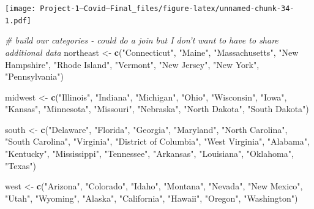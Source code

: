 \documentclass[
]{article}
\newenvironment{Shaded}{\begin{snugshade}}{\end{snugshade}}
\newcommand{\CommentTok}[1]{\textcolor[rgb]{0.56,0.35,0.01}{\textit{#1}}}
\newcommand{\KeywordTok}[1]{\textcolor[rgb]{0.13,0.29,0.53}{\textbf{#1}}}
\newcommand{\NormalTok}[1]{#1}
\newcommand{\StringTok}[1]{\textcolor[rgb]{0.31,0.60,0.02}{#1}}
\begin{document}
\texttt{[image: Project-1---Covid---Final\_files/figure-latex/unnamed-chunk-34-1.pdf]}

\begin{Shaded}
\begin{Highlighting}[]
\CommentTok{# build our categories - could do a join but I don't want to have to share additional data}
\NormalTok{northeast <-}\StringTok{ }\KeywordTok{c}\NormalTok{(}\StringTok{"Connecticut"}\NormalTok{, }\StringTok{"Maine"}\NormalTok{, }\StringTok{"Massachusetts"}\NormalTok{, }\StringTok{"New Hampshire"}\NormalTok{, }\StringTok{"Rhode Island"}\NormalTok{, }\StringTok{"Vermont"}\NormalTok{, }\StringTok{"New Jersey"}\NormalTok{, }\StringTok{"New York"}\NormalTok{, }\StringTok{"Pennsylvania"}\NormalTok{)}

\NormalTok{midwest <-}\StringTok{ }\KeywordTok{c}\NormalTok{(}\StringTok{"Illinois"}\NormalTok{, }\StringTok{"Indiana"}\NormalTok{, }\StringTok{"Michigan"}\NormalTok{, }\StringTok{"Ohio"}\NormalTok{, }\StringTok{"Wisconsin"}\NormalTok{, }\StringTok{"Iowa"}\NormalTok{, }\StringTok{"Kansas"}\NormalTok{, }\StringTok{"Minnesota"}\NormalTok{, }\StringTok{"Missouri"}\NormalTok{, }\StringTok{"Nebraska"}\NormalTok{, }\StringTok{"North Dakota"}\NormalTok{, }\StringTok{"South Dakota"}\NormalTok{)}

\NormalTok{south <-}\StringTok{ }\KeywordTok{c}\NormalTok{(}\StringTok{"Delaware"}\NormalTok{, }\StringTok{"Florida"}\NormalTok{, }\StringTok{"Georgia"}\NormalTok{, }\StringTok{"Maryland"}\NormalTok{, }\StringTok{"North Carolina"}\NormalTok{, }\StringTok{"South Carolina"}\NormalTok{, }\StringTok{"Virginia"}\NormalTok{, }\StringTok{"District of Columbia"}\NormalTok{, }\StringTok{"West Virginia"}\NormalTok{, }\StringTok{"Alabama"}\NormalTok{, }\StringTok{"Kentucky"}\NormalTok{, }\StringTok{"Mississippi"}\NormalTok{, }\StringTok{"Tennessee"}\NormalTok{, }\StringTok{"Arkansas"}\NormalTok{, }\StringTok{"Louisiana"}\NormalTok{, }\StringTok{"Oklahoma"}\NormalTok{, }\StringTok{"Texas"}\NormalTok{)}

\NormalTok{west <-}\StringTok{ }\KeywordTok{c}\NormalTok{(}\StringTok{"Arizona"}\NormalTok{, }\StringTok{"Colorado"}\NormalTok{, }\StringTok{"Idaho"}\NormalTok{, }\StringTok{"Montana"}\NormalTok{, }\StringTok{"Nevada"}\NormalTok{, }\StringTok{"New Mexico"}\NormalTok{, }\StringTok{"Utah"}\NormalTok{, }\StringTok{"Wyoming"}\NormalTok{, }\StringTok{"Alaska"}\NormalTok{, }\StringTok{"California"}\NormalTok{, }\StringTok{"Hawaii"}\NormalTok{, }\StringTok{"Oregon"}\NormalTok{, }\StringTok{"Washington"}\NormalTok{)}


\end{Highlighting}
\end{Shaded}
\end{document}

